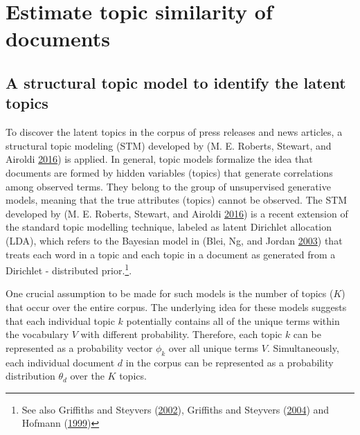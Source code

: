 \documentclass[
]{article}
\begin{document}
\hypertarget{estimate-topic-similarity-of-documents}{%
\section{Estimate topic similarity of
documents}\label{estimate-topic-similarity-of-documents}}

\hypertarget{a-structural-topic-model-to-identify-the-latent-topics}{%
\subsection{A structural topic model to identify the latent
topics}\label{a-structural-topic-model-to-identify-the-latent-topics}}

To discover the latent topics in the corpus of press releases and news
articles, a structural topic modeling (STM) developed by (M. E. Roberts,
Stewart, and Airoldi \protect\hyperlink{ref-roberts_model_2016}{2016})
is applied. In general, topic models formalize the idea that documents
are formed by hidden variables (topics) that generate correlations among
observed terms. They belong to the group of unsupervised generative
models, meaning that the true attributes (topics) cannot be observed.
The STM developed by (M. E. Roberts, Stewart, and Airoldi
\protect\hyperlink{ref-roberts_model_2016}{2016}) is a recent extension
of the standard topic modelling technique, labeled as latent Dirichlet
allocation (LDA), which refers to the Bayesian model in (Blei, Ng, and
Jordan \protect\hyperlink{ref-blei_latent_2003}{2003}) that treats each
word in a topic and each topic in a document as generated from a
Dirichlet - distributed prior.\footnote{See also Griffiths and Steyvers
  (\protect\hyperlink{ref-griffiths_probabilistic_2002}{2002}),
  Griffiths and Steyvers
  (\protect\hyperlink{ref-griffiths_finding_2004}{2004}) and Hofmann
  (\protect\hyperlink{ref-hofmann_probabilistic_1999}{1999})}.

One crucial assumption to be made for such models is the number of
topics (\(K\)) that occur over the entire corpus. The underlying idea
for these models suggests that each individual topic \(k\) potentially
contains all of the unique terms within the vocabulary \(V\) with
different probability. Therefore, each topic \(k\) can be represented as
a probability vector \(\phi_k\) over all unique terms \(V\).
Simultaneously, each individual document \(d\) in the corpus can be
represented as a probability distribution \(\theta_d\) over the \(K\)
topics.
\end{document}
